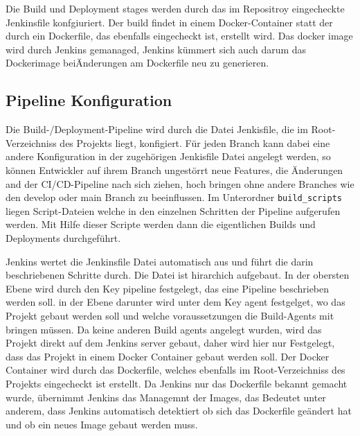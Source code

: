 Die Build und Deployment stages werden durch das im Repositroy eingecheckte Jenkinsfile konfgiuriert. Der build findet in einem Docker-Container statt der durch ein Dockerfile, das ebenfalls eingecheckt ist, erstellt wird. Das docker image wird durch Jenkins gemanaged, Jenkins kümmert sich auch darum das Dockerimage beiÄnderungen am Dockerfile neu zu generieren.

\subsection{Pipeline Konfiguration}

Die Build-/Deployment-Pipeline wird durch die Datei Jenkisfile, die im Root-Verzeichniss des Projekts liegt, konfigiert. Für jeden Branch kann dabei eine andere Konfiguration in der zugehörigen Jenkisfile Datei angelegt werden, so können Entwickler auf ihrem Branch ungestörrt neue Features, die Änderungen and der CI/CD-Pipeline nach sich ziehen, hoch bringen ohne andere Branches wie den develop oder main Branch zu beeinflussen.
Im Unterordner \lstinline{build_scripts} liegen Script-Dateien welche in den einzelnen Schritten der Pipeline aufgerufen werden. Mit Hilfe dieser Scripte werden dann die eigentlichen Builds und Deployments durchgeführt.

Jenkins wertet die Jenkinsfile Datei automatisch aus und führt die darin beschriebenen Schritte durch. Die Datei ist hirarchich aufgebaut. In der obersten Ebene wird durch den Key \glqq pipeline\grqq{} festgelegt, das eine Pipeline beschrieben werden soll. in der Ebene darunter wird unter dem Key \glqq  agent\grqq{} festgelget, wo das Projekt gebaut werden soll und welche voraussetzungen die Build-Agents mit bringen müssen. Da keine anderen Build agents angelegt wurden, wird das Projekt direkt auf dem Jenkins server gebaut, daher wird hier nur Festgelegt, dass das Projekt in einem Docker Container gebaut werden soll. Der Docker Container wird durch das Dockerfile, welches ebenfalls im Root-Verzeichniss des Projekts eingecheckt ist erstellt. Da Jenkins nur das Dockerfile bekannt gemacht wurde, übernimmt Jenkins das Managemnt der Images, das Bedeutet unter anderem, dass Jenkins automatisch detektiert ob sich das Dockerfile geändert hat und ob ein neues Image gebaut werden muss.


